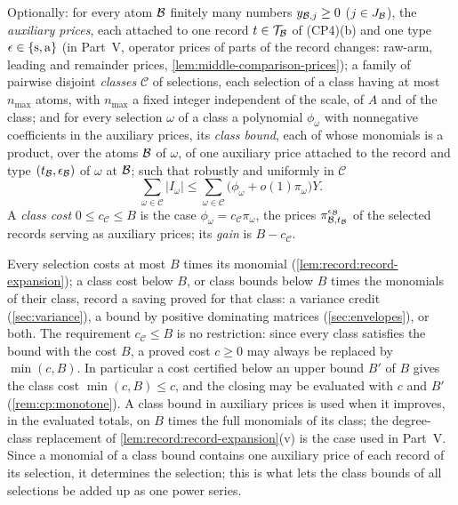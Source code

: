 \begin{definition}\label{def:cp5}
Optionally: for every atom $\mathcal B$ finitely many numbers $y_{\mathcal B,j}\ge0$
($j\in J_\mathcal B$), the \emph{auxiliary prices}, each attached to one record
$t\in\mathcal T_\mathcal B$ of (CP4)(b) and one type $\epsilon\in\{{\rm s},{\rm a}\}$
(in Part~V, operator prices of parts of the record changes: raw-arm, leading
and remainder prices, \cref{lem:middle-comparison-prices}); a family of
pairwise disjoint \emph{classes} $\mathcal C$ of selections, each selection
of a class having at most $n_{\max}$ atoms, with $n_{\max}$ a fixed integer
independent of the scale, of $A$ and of the class; and for every
selection $\omega$ of a class a polynomial $\phi_\omega$ with nonnegative
coefficients in the auxiliary prices, its \emph{class bound}, each of whose
monomials is a product, over the atoms $\mathcal B$ of $\omega$, of one auxiliary
price attached to the record and type $(t_\mathcal B,\epsilon_\mathcal B)$ of $\omega$ at
$\mathcal B$; such that robustly and uniformly in $\mathcal C$
\[
 \sum_{\omega\in\mathcal C}|I_\omega|\le\sum_{\omega\in\mathcal C}
 \bigl(\phi_\omega+o(1)\pi_\omega\bigr)Y .
\]
A \emph{class cost} $0\le c_{\mathcal C}\le B$ is the case
$\phi_\omega=c_{\mathcal C}\pi_\omega$, the prices
$\pi^{\epsilon_\mathcal B}_{\mathcal B,t_\mathcal B}$ of the selected records serving as auxiliary
prices; its \emph{gain} is $B-c_{\mathcal C}$.
\end{definition}

Every selection costs at most $B$ times its monomial
(\cref{lem:record:record-expansion}); a class cost below $B$, or class bounds
below $B$ times the monomials of their class, record a saving proved for that
class: a variance credit (\cref{sec:variance}), a bound by
positive dominating matrices (\cref{sec:envelopes}), or both. The
requirement
$c_{\mathcal C}\le B$ is no restriction: since every class satisfies the
bound with the cost $B$, a proved cost $c\ge0$ may always be replaced by
$\min(c,B)$. In particular a cost certified below an upper bound $B'$ of $B$
gives the class cost $\min(c,B)\le c$, and the closing may be evaluated with
$c$ and $B'$ (\cref{rem:cp:monotone}). A class bound in auxiliary prices is
used when it improves, in the evaluated totals, on $B$ times the full
monomials of its class; the degree-class replacement of
\cref{lem:record:record-expansion}(v) is the case used in Part~V. Since a
monomial of a class bound contains one auxiliary price of each record of its
selection, it determines the selection; this is what lets the class bounds of
all selections be added up as one power series.

